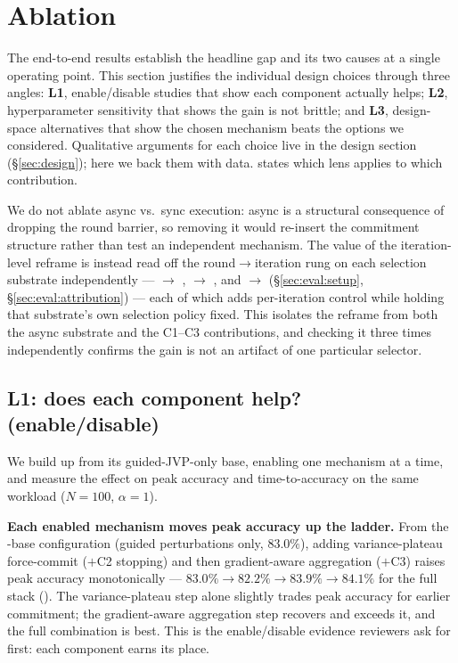 \section{Ablation}
\label{sec:ablation}

The end-to-end results establish the headline gap and its two causes
at a single operating point. This section justifies the individual
design choices through three angles: \textbf{L1}, enable/disable
studies that show each component actually helps; \textbf{L2},
hyperparameter sensitivity that shows the gain is not brittle; and
\textbf{L3}, design-space alternatives that show the chosen mechanism
beats the options we considered. Qualitative arguments for each choice
live in the design section (\S\ref{sec:design}); here we back them
with data.  states which lens applies to
which contribution.



We do not ablate async vs.\ sync execution: async is a structural
consequence of dropping the round barrier, so removing it would
re-insert the commitment structure rather than test an independent
mechanism. The value of the iteration-level reframe is instead read
off the round$\to$iteration rung on each selection substrate
independently --- \fwdllm{} $\to$ \fwdllmit{}, \fedbuffp{} $\to$
\fedbuffpit{}, and \felixp{} $\to$ \felixpit{}
(\S\ref{sec:eval:setup}, \S\ref{sec:eval:attribution}) --- each of
which adds per-iteration control while holding that substrate's own
selection policy fixed. This isolates the reframe from both the async
substrate and the C1--C3 contributions, and checking it three times
independently confirms the gain is not an artifact of one particular
selector.

\subsection{L1: does each component help? (enable/disable)}
\label{sec:ablation:ladder}

We build \sys{} up from its guided-JVP-only base, enabling one
mechanism at a time, and measure the effect on peak accuracy and
time-to-accuracy on the same workload ($N{=}100$, $\alpha{=}1$).



\textbf{Each enabled mechanism moves peak accuracy up the ladder.}
From the \sys{}-base configuration (guided perturbations only,
$83.0\%$), adding variance-plateau force-commit ($+$C2 stopping) and
then gradient-aware aggregation ($+$C3) raises peak accuracy
monotonically --- $83.0\% \to 82.2\% \to 83.9\% \to 84.1\%$ for the
full stack (). The variance-plateau
step alone slightly trades peak accuracy for earlier commitment; the
gradient-aware aggregation step recovers and exceeds it, and the full
combination is best. This is the enable/disable evidence reviewers ask
for first: each component earns its place.

